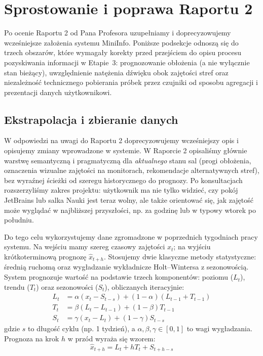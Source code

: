 \documentclass[14pt,a4paper]{extarticle}
\begin{document}
\section{Sprostowanie i poprawa Raportu 2}

Po ocenie Raportu 2 od Pana Profesora uzupełniamy i doprecyzowujemy wcześniejsze założenia systemu MiniInfo. Poniższe podsekcje odnoszą się do trzech obszarów, które wymagały korekty przed przejściem do opisu procesu pozyskiwania informacji w Etapie~3: prognozowanie obłożenia (a nie wyłącznie stan bieżący), uwzględnienie natężenia dźwięku obok zajętości stref oraz niezależność technicznego pobierania próbek przez czujniki od sposobu agregacji i prezentacji danych użytkownikowi.

\subsection{Ekstrapolacja i zbieranie danych}
W odpowiedzi na uwagi do Raportu 2 doprecyzowujemy wcześniejszy opis i opisujemy zmiany wprowadzone w systemie. W Raporcie 2 opisaliśmy głównie warstwę semantyczną i pragmatyczną dla \emph{aktualnego} stanu sal (progi obłożenia, oznaczenia wizualne zajętości na monitorach, rekomendacje alternatywnych stref), bez wyraźnej ścieżki od szeregu historycznego do prognozy. Po konsultacjach rozszerzyliśmy zakres projektu: użytkownik ma nie tylko widzieć, czy pokój JetBrains lub salka Nauki jest teraz wolny, ale także orientować się, jak zajętość może wyglądać w najbliższej przyszłości, np. za godzinę lub w typowy wtorek po południu.

Do tego celu wykorzystujemy dane zgromadzone w poprzednich tygodniach pracy systemu. Na wejściu mamy szereg czasowy zajętości $x_t$; na wyjściu krótkoterminową prognozę $\hat{x}_{t+h}$. Stosujemy dwie klasyczne metody statystyczne: średnią ruchomą oraz wygładzanie wykładnicze Holt--Wintersa z sezonowością. System prognozuje wartość na podstawie trzech komponentów: poziomu ($L_t$), trendu ($T_t$) oraz sezonowości ($S_t$), obliczanych iteracyjnie:
\begin{align}
    L_t &= \alpha (x_t - S_{t-s}) + (1-\alpha)(L_{t-1} + T_{t-1}) \\
    T_t &= \beta (L_t - L_{t-1}) + (1-\beta)T_{t-1} \\
    S_t &= \gamma (x_t - L_t) + (1-\gamma)S_{t-s}
\end{align}
gdzie $s$ to długość cyklu (np. 1 tydzień), a $\alpha, \beta, \gamma \in [0,1]$ to wagi wygładzania. Prognoza na krok $h$ w przód wyraża się wzorem:
\begin{equation}
    \hat{x}_{t+h} = L_t + h T_t + S_{t+h-s}
\end{equation}
\end{document}
